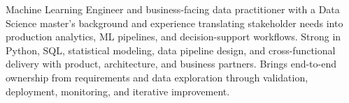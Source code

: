 

\begin{cvparagraph}


Machine Learning Engineer and business-facing data practitioner with a Data Science master's background and experience translating stakeholder needs into production analytics, ML pipelines, and decision-support workflows. Strong in Python, SQL, statistical modeling, data pipeline design, and cross-functional delivery with product, architecture, and business partners. Brings end-to-end ownership from requirements and data exploration through validation, deployment, monitoring, and iterative improvement.
\end{cvparagraph}
